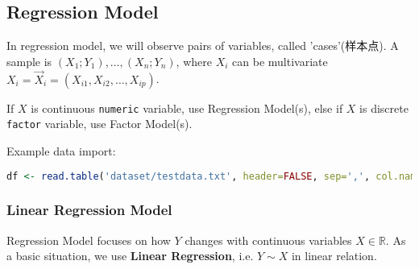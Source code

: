 \subsection{Regression Model}


    In regression model, we will observe pairs of variables, called 'cases'(样本点). A sample is $ (X_1;Y_1),\ldots,(X_n;Y_n) $, where $ X_i $ can be multivariate $ X_i=\vec{X}_i=(X_{i1},X_{i2},\ldots,X_{ip}) $.

    If $ X $ is continuous \lstinline|numeric| variable, use Regression Model(s), else if $ X $ is discrete \lstinline|factor| variable, use Factor Model(s). 

\begin{rcode}
    Example data import:
\begin{lstlisting}[language=R]
df <- read.table('dataset/testdata.txt', header=FALSE, sep=',', col.names = c('y','x1','x2'))
\end{lstlisting}
\end{rcode}


\subsubsection{Linear Regression Model}
    Regression Model focuses on how $ Y $ changes with continuous variables $ X\in\mathbb{R} $. As a basic situation, we use \textbf{Linear Regression}, i.e. $ Y\sim X $ in linear relation.  


